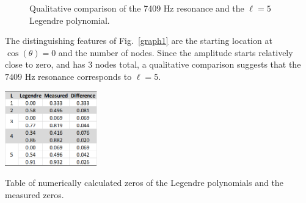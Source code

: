 \documentclass[12pt]{article}
\newcommand{\figref}[1]{Fig.\ \ref{#1}}
\begin{document}
	\begin{figure}[H]
		\centering
		\qquad
		\caption{Qualitative comparison of the 7409 Hz resonance and the $\ell=5$ Legendre polynomial.}
		\label{comparison}
	\end{figure}

	
	The distinguishing features of \figref{graph1} are the starting location at $\cos(\theta) = 0$ and the number of nodes. Since the amplitude starts relatively close to zero, and has $3$ nodes total, a qualitative comparison suggests that the $7409$ Hz resonance corresponds to $\ell=5$.
	
	
	\begin{table}
		\centering
		\includegraphics[width=0.3\textwidth]{Tables/LegendreTable.png}
		\caption{Table of numerically calculated zeros of the Legendre polynomials and the measured zeros.}
		\label{legendreTable}
	\end{table}
	
\end{document}
